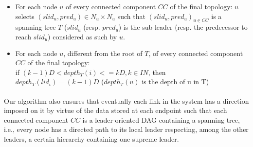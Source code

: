 \begin{itemize}
	\item For each node $u$ of every connected component $CC$ of the final topology:
	$u$ selects ${(slid_u, pred_u) \in N_u \times N_u}$ such that ${(slid_u, pred_u)}_{u \in CC}$ is a spanning tree $T$ ($slid_u$ (resp. $pred_u$) is the sub-leader (resp. the predecessor to reach $slid_u$) considered as such by $u$.
	\item For each node $u$, different from the root of $T$, of every connected component $CC$ of the final topology:\\
	if $ (k-1)D < depth_T (i) <= kD, k \in IN $, then $ depth_T(lid_i)=(k-1)D$ ($depth_T(u)$ is the depth of u in T)
\end{itemize}

\paragraph{}Our algorithm also ensures that eventually each link in the system has a direction imposed on it by virtue of the data stored at each endpoint such that each connected component $CC$ is a leader-oriented DAG containing a spanning tree, i.e., every node has a directed path to its local leader respecting, among the other leaders, a certain hierarchy containing one supreme leader.